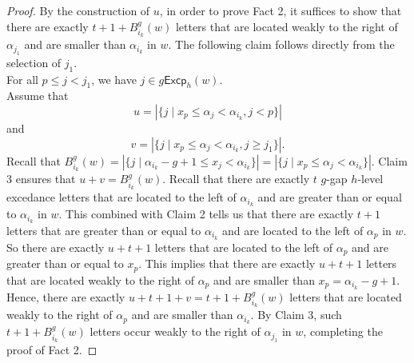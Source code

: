 \documentclass[12pt]{article}
\numberwithin{equation}{section}
\theoremstyle{plain}
\def\Excp{\mathsf{Excp}}
\begin{document}
\begin{proof}
   By the construction of $u$, in order to prove  Fact 2, it suffices to show that there are exactly $t+1+B^g_{i_k}(w)$ letters that are located weakly to the right of  $\alpha_{j_{1}}$ and  are smaller than $\alpha_{i_k}$ in $w$. 
  The following claim follows directly from   the selection of $j_{1}$. \\
   For all $p\leq j<j_{1}$, we have $j\in g\Excp_{h}(w)$. \\
   Assume that 
   $$
   u=|\{j\mid x_p\leq \alpha_{j}<\alpha_{i_k}, j<p\} |  
   $$
   and 
   $$
   v=|\{j\mid x_p\leq \alpha_{j}<\alpha_{i_k}, j\geq j_{1}\} | .
   $$
   Recall that $B^g_{i_k}(w)=|\{j\mid \alpha_{i_k}-g+1\leq x_{j}<\alpha_{i_k} \}|=|\{j\mid x_p\leq \alpha_{j}<\alpha_{i_k} \}|$.
   Claim  3 ensures that $u+v=B^g_{i_k}(w)$.  
   Recall that there are exactly $t$ $g$-gap $h$-level excedance letters that are located to the left of $\alpha_{i_k}$ and   are greater than or equal to $\alpha_{i_k}$ in $w$.  This   combined with Claim 2 tells us that  there are exactly $t+1$ letters that are greater than or equal to $\alpha_{i_k}$ and   are located to the left of $\alpha_{p}$ in $w$.    So there are exactly $u+t+1$ letters that are located to the left of $\alpha_p$ and  are greater than or equal to $x_p$. This implies that there are exactly $u+t+1$ letters that are located weakly to the right of  $\alpha_{p}$ and  are smaller than $x_p=\alpha_{i_k}-g+1$. Hence, there are exactly $u+t+1+v=t+1+B^g_{i_k}(w)$ letters that are located weakly to the right of  $\alpha_{p}$ and  are smaller than $\alpha_{i_k}$. 
    By Claim 3, such $t+1+B^g_{i_k}(w)$   letters  occur weakly to the right of $\alpha_{j_{1}}$ in $w$, completing the proof of Fact 2. 
	\end{proof}
 
\end{document}
